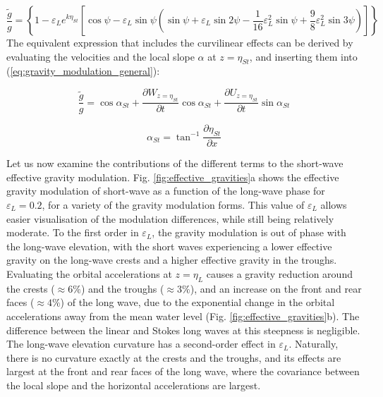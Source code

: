 \documentclass[lineno]{jfm}
\begin{document}
\begin{equation}
\label{eq:gravity_modulation_stokes}
\frac{\widetilde{g}}{g} =
\left\{
  1 - \varepsilon_L e^{k \eta_{St}}
  \left[ \cos{\psi} -
    \varepsilon_L \sin{\psi} \left(
      \sin{\psi}
      + \varepsilon_L \sin{2\psi}
      - \dfrac{1}{16} \varepsilon_L^2 \sin{\psi}
      + \dfrac{9}{8} \varepsilon_L^2 \sin{3\psi}
    \right)
  \right]
\right\}
\end{equation}
The equivalent expression that includes the curvilinear effects can be derived
by evaluating the velocities and the local slope $\alpha$ at $z = \eta_{St}$,
and inserting them into (\ref{eq:gravity_modulation_general}):

\begin{equation}
\label{eq:gravity_modulation_general_stokes}
\frac{\widetilde{g}}{g}
  = \cos{\alpha_{St}}
  + \dfrac{\partial W_{z=\eta_{St}}}{\partial t} \cos{\alpha_{St}}
  + \dfrac{\partial U_{z=\eta_{St}}}{\partial t} \sin{\alpha_{St}}
\end{equation}

\begin{equation}
\label{eq:local_slope_stokes}
\alpha_{St} = \tan^{-1}{\dfrac{\partial \eta_{St}}{\partial x}}
\end{equation}

Let us now examine the contributions of the different terms to the short-wave
effective gravity modulation.
Fig. \ref{fig:effective_gravities}a shows the effective gravity modulation of
short-wave as a function of the long-wave phase for $\varepsilon_L = 0.2$, for
a variety of the gravity modulation forms.
This value of $\varepsilon_L$ allows easier visualisation of the modulation
differences, while still being relatively moderate.
To the first order in $\varepsilon_L$, the gravity modulation is out of phase
with the long-wave elevation, with the short waves experiencing a lower effective
gravity on the long-wave crests and a higher effective gravity in the troughs.
Evaluating the orbital accelerations at $z=\eta_L$ causes a gravity reduction
around the crests ($\approx6\%$) and the troughs ($\approx 3\%$), and an
increase on the front and rear faces ($\approx 4\%$) of the long wave, due to
the exponential change in the orbital accelerations away from the mean water level
(Fig. \ref{fig:effective_gravities}b).
The difference between the linear and Stokes long waves at this steepness is
negligible.
The long-wave elevation curvature has a second-order effect in $\varepsilon_L$.
Naturally, there is no curvature exactly at the crests and the troughs, and its
effects are largest at the front and rear faces of the long wave, where the
covariance between the local slope and the horizontal accelerations are largest.
\end{document}
